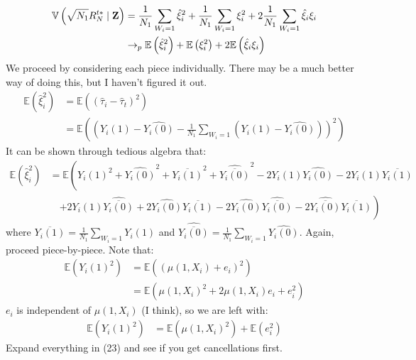 \documentclass[10pt,letterpaper]{article}
\begin{document}
\begin{align}
\mathbb{V}\left( \sqrt{N_1} R_N^{t*} \mid \bold{Z} \right) &= \frac{1}{N_1} \sum_{W_i = 1} \hat{\xi}_i^2  +  \frac{1}{N_1} \sum_{W_i = 1} \xi_i^2  + 2 \frac{1}{N_1} \sum_{W_i = 1} \hat{\xi}_i \xi_i \\
&\rightarrow_p \mathbb{E}\left(\hat{\xi}_i^2 \right) + \mathbb{E}\left(\xi_i^2\right) + 2 \mathbb{E}\left( \hat{\xi}_i \xi_i \right) 
\end{align}
We proceed by considering each piece individually. There may be a much better way of doing this, but I haven't figured it out.
\begin{align}
\mathbb{E}\left( \hat{\xi}_i^2 \right) &= \mathbb{E}\left( \left(\hat{\tau}_i - \hat{\tau}_t \right)^2\right) \nonumber \\
&= \mathbb{E}\left(\left( Y_i(1) - \widehat{Y_i(0)} - \frac{1}{N_1} \sum_{W_i=1} \left(Y_i(1) - \widehat{Y_i(0)} \right) \right)^2\right)
\end{align}
It can be shown through tedious algebra that:
\begin{align}
\mathbb{E}\left( \hat{\xi}_i^2 \right) &= \mathbb{E}\left( Y_i(1)^2 + \widehat{Y_i(0)}^2 + \overline{Y_i(1)}^2 + \widehat{\overline{Y_i(0)}}^2 - 2 Y_i(1) \widehat{Y_i(0)} - 2 Y_i(1) \overline{Y_i(1)} \right. \nonumber \\
&\quad \left. + 2Y_i(1) \widehat{\overline{Y_i(0)}} + 2 \widehat{Y_i(0)} \overline{Y_i(1)} - 2\widehat{Y_i(0)} \widehat{\overline{Y_i(0)}} - 2 \widehat{\overline{Y_i(0)}} \overline{Y_i(1)} \right)
\end{align}
where $\overline{Y_i(1)} = \frac{1}{N_1} \sum_{W_i=1} Y_i(1)$ and $\widehat{\overline{Y_i(0)}} = \frac{1}{N_1} \sum_{W_i = 1} \widehat{Y_i(0)}$. Again, proceed piece-by-piece. Note that:
\begin{align}
\mathbb{E}\left(Y_i(1)^2 \right) &= \mathbb{E}\left(\left(\mu(1,X_i) + e_i\right)^2\right) \nonumber \\
&= \mathbb{E}\left( \mu(1,X_i)^2 + 2 \mu(1,X_i)e_i + e_i^2 \right)
\end{align}
$e_i$ is independent of $\mu(1,X_i)$ (I think), so we are left with:
\begin{align}
\mathbb{E}\left( Y_i(1)^2 \right) &= \mathbb{E}\left( \mu(1,X_i)^2 \right) + \mathbb{E}\left(e_i^2\right)
\end{align}
Expand everything in (23) and see if you get cancellations first.
\end{document}
